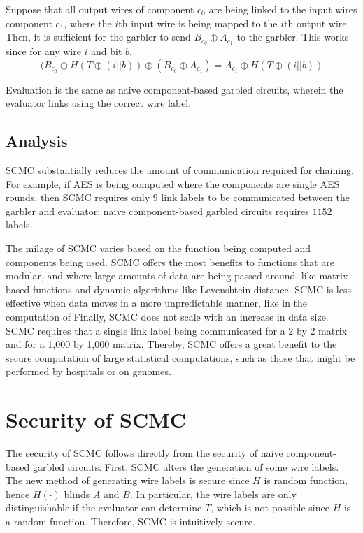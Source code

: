 Suppose that all output wires of component $c_0$ are being linked to the input wires component $c_1$, where the $i$th input wire is being mapped to the $i$th output wire. 
Then, it is sufficient for the garbler to send $B_{c_0} \oplus A_{c_1}$ to the garbler. 
This works since for any wire $i$ and bit $b$,
\begin{equation}
(B_{c_0} \oplus H(T \oplus (i || b)) \oplus (B_{c_0} \oplus A_{c_1}) = A_{c_1} \oplus H(T \oplus (i || b))
\end{equation}

Evaluation is the same as naive component-based garbled circuits, wherein the evaluator links using the correct wire label.

\subsection{Analysis}
SCMC substantially reduces the amount of communication required for chaining. 
For example, if AES is being computed where the components are single AES rounds, then SCMC requires only $9$ link labels to be communicated between the garbler and evaluator; naive component-based garbled circuits requires $1152$ labels. 

The milage of SCMC varies based on the function being computed and components being used. 
SCMC offers the most benefits to functions that are modular, and where large amounts of data are being passed around, like matrix-based functions and dynamic algorithms like Levenshtein distance. 
SCMC is less effective when data moves in a more unpredictable manner, like in the computation of 
Finally, SCMC does not scale with an increase in data size. 
SCMC requires that a single link label being communicated for a 2 by 2 matrix and for a 1,000 by 1,000 matrix. 
Thereby, SCMC offers a great benefit to the secure computation of large statistical computations, such as those that might be performed by hospitals or on genomes. 

\section{Security of SCMC}
The security of SCMC follows directly from the security of naive component-based garbled circuits. 
First, SCMC alters the generation of some wire labels.
The new method of generating wire labels is secure since $H$ is random function, hence $H(\cdot)$ blinds $A$ and $B$.
In particular, the wire labels are only distinguishable if the evaluator can determine $T$, which is not possible since $H$ is a random function.
Therefore, SCMC is intuitively secure. 
